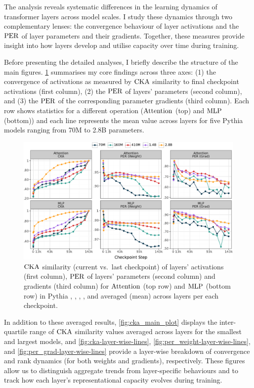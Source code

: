 The analysis reveals systematic differences in the learning dynamics of transformer layers across model scales. I study these dynamics through two complementary lenses: the convergence behaviour of layer activations and the $\mathrm{PER}$ of layer parameters and their gradients. Together, these measures provide insight into how layers develop and utilise capacity over time during training.

Before presenting the detailed analyses, I briefly describe the structure of the main figures. \cref{fig:main-results} summarises my core findings across three axes: (1) the convergence of activations as measured by $\mathrm{CKA}$ similarity to final checkpoint activations (first column), (2) the $\mathrm{PER}$ of layers' parameters (second column), and (3) the $\mathrm{PER}$ of the corresponding parameter gradients (third column). Each row shows statistics for a different operation ($\mathrm{Attention}$ (top) and $\mathrm{MLP}$ (bottom)) and each line represents the mean value across layers for five Pythia models ranging from 70M to 2.8B parameters.


\begin{figure}[h!]
    \centering
    \includegraphics[width=\linewidth]{chapters/tending-towards-stability/figures/results.pdf}
    \vspace{-15pt}
    \caption{$\mathrm{CKA}$ similarity (current vs.\ last checkpoint) of layers' activations (first column), $\mathrm{PER}$ of layers' parameters (second column) and gradients (third column) for $\mathrm{Attention}$ (top row) and $\mathrm{MLP}$ (bottom row) in Pythia \sevenmil, \sixmil, \fourmil, \onebil, and \twobil averaged (mean) across layers per each checkpoint.}
    \label{fig:main-results}
\end{figure}


In addition to these averaged results, \cref{fig:cka_main_plot} displays the inter-quartile range of $\mathrm{CKA}$ similarity values averaged across layers for the smallest and largest models, and \cref{fig:cka-layer-wise-lines}, \cref{fig:per_weight-layer-wise-lines}, and \cref{fig:per_grad-layer-wise-lines} provide a layer-wise breakdown of convergence and rank dynamics (for both weights and gradients), respectively. These figures allow us to distinguish aggregate trends from layer-specific behaviours and to track how each layer's representational capacity evolves during training.

